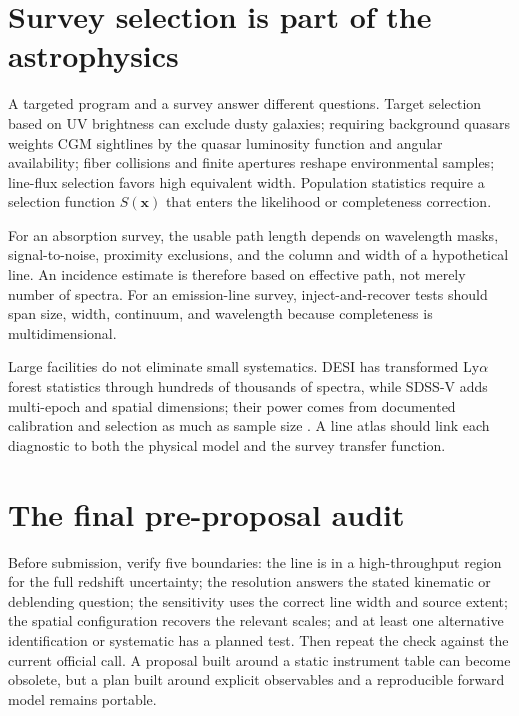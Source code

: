 \section{Survey selection is part of the astrophysics}

A targeted program and a survey answer different questions. Target selection
based on UV brightness can exclude dusty galaxies; requiring background
quasars weights CGM sightlines by the quasar luminosity function and angular
availability; fiber collisions and finite apertures reshape environmental
samples; line-flux selection favors high equivalent width. Population
statistics require a selection function $S(\boldsymbol{x})$ that enters the
likelihood or completeness correction.

For an absorption survey, the usable path length depends on wavelength masks,
signal-to-noise, proximity exclusions, and the column and width of a
hypothetical line. An incidence estimate is therefore based on effective path,
not merely number of spectra. For an emission-line survey, inject-and-recover
tests should span size, width, continuum, and wavelength because completeness
is multidimensional.

Large facilities do not eliminate small systematics. DESI has transformed
Ly$\alpha$ forest statistics through hundreds of thousands of spectra, while
SDSS-V adds multi-epoch and spatial dimensions; their power comes from
documented calibration and selection as much as sample size
\citep{DESI2025LyA,SDSSVDocs2026}. A line atlas should link each diagnostic to
both the physical model and the survey transfer function.

\section{The final pre-proposal audit}

Before submission, verify five boundaries: the line is in a high-throughput
region for the full redshift uncertainty; the resolution answers the stated
kinematic or deblending question; the sensitivity uses the correct line width
and source extent; the spatial configuration recovers the relevant scales;
and at least one alternative identification or systematic has a planned test.
Then repeat the check against the current official call. A proposal built
around a static instrument table can become obsolete, but a plan built around
explicit observables and a reproducible forward model remains portable.
